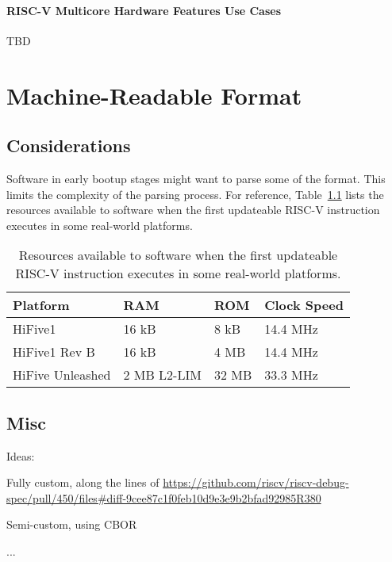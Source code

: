 \subsubsection{RISC-V Multicore Hardware Features Use Cases}

TBD

\chapter{Machine-Readable Format}

\section{Considerations}

Software in early bootup stages might want to parse some of the format. This
limits the complexity of the parsing process. For reference,
Table~\ref{tab:earlyresources} lists the resources available to software when
the first updateable RISC-V instruction executes in some real-world platforms.

\begin{table}[H]
    \centering
    \caption{Resources available to software when the first updateable RISC-V
    instruction executes in some real-world platforms.}
    \label{tab:earlyresources}
    \begin{tabular}{|l|l|l|l}
        \hline
        Platform & RAM & ROM & Clock Speed \\
        \hline
        HiFive1 & 16 kB & 8 kB & 14.4 MHz \\
        \hline
        HiFive1 Rev B & 16 kB & 4 MB & 14.4 MHz \\
        \hline
        HiFive Unleashed & 2 MB L2-LIM & 32 MB & 33.3 MHz \\
        \hline
    \end{tabular}
\end{table}

\section{Misc}

\begin{steps}{Ideas:}
\item Fully custom, along the lines of
    \url{https://github.com/riscv/riscv-debug-spec/pull/450/files#diff-9cee87c1f0feb10d9e3e9b2bfad92985R380}
\item Semi-custom, using CBOR
\item ...
\end{steps}

